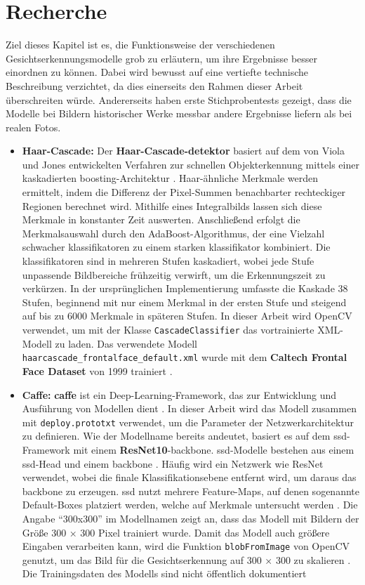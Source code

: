 \chapter{Recherche}
%
Ziel dieses Kapitel ist es, die Funktionsweise der verschiedenen Gesichtserkennungsmodelle grob zu erläutern, um ihre Ergebnisse besser einordnen zu können. Dabei wird bewusst auf eine vertiefte technische Beschreibung verzichtet, da dies einerseits den Rahmen dieser Arbeit überschreiten würde. Andererseits haben erste Stichprobentests gezeigt, dass die Modelle bei Bildern historischer Werke messbar andere Ergebnisse liefern als bei realen Fotos.

\begin{itemize} %
	\item \textbf{Haar-Cascade:} Der \textbf{Haar-Cascade-\gls{detektor}} basiert auf dem von Viola und Jones entwickelten Verfahren zur schnellen Objekterkennung mittels einer kaskadierten \gls{boosting}-Architektur \parencite{ViolaJones2001}. Haar-ähnliche Merkmale werden ermittelt, indem die Differenz der Pixel-Summen benachbarter rechteckiger Regionen berechnet wird. Mithilfe eines Integralbilds lassen sich diese Merkmale in konstanter Zeit auswerten. Anschließend erfolgt die Merkmalsauswahl durch den AdaBoost-Algorithmus, der eine Vielzahl schwacher \gls{klassifikator}en zu einem starken \gls{klassifikator} kombiniert. Die \gls{klassifikator}en sind in mehreren Stufen kaskadiert, wobei jede Stufe unpassende Bildbereiche frühzeitig verwirft, um die Erkennungszeit zu verkürzen. In der ursprünglichen Implementierung umfasste die Kaskade 38 Stufen, beginnend mit nur einem Merkmal in der ersten Stufe und steigend auf bis zu 6000 Merkmale in späteren Stufen. 
In dieser Arbeit wird OpenCV verwendet, um mit der Klasse \texttt{CascadeClassifier} das vortrainierte XML-Modell zu laden. Das verwendete Modell \texttt{haarcascade\_frontalface\_default.xml} wurde mit dem \textbf{Caltech Frontal Face Dataset} von 1999 trainiert \parencite[101–102]{howse2019opencv}.
%
	\item \textbf{Caffe:} \textbf{\gls{caffe}} ist ein Deep-Learning-Framework, das zur Entwicklung und Ausführung von Modellen dient \parencite{JiaSDKLGGD14}. In dieser Arbeit wird das Modell  zusammen mit \texttt{deploy.prototxt} verwendet, um die Parameter der Netzwerkarchitektur zu definieren. Wie der Modellname bereits andeutet, basiert es auf dem \gls{ssd}-Framework mit einem \textbf{ResNet10}-\gls{backbone}. \gls{ssd}-Modelle bestehen aus einem \gls{ssd}-Head und einem \gls{backbone} \parencite{Esri2025SSD}. Häufig wird ein Netzwerk wie ResNet verwendet, wobei die finale Klassifikationsebene entfernt wird, um daraus das \gls{backbone} zu erzeugen. \gls{ssd} nutzt mehrere Feature-Maps, auf denen sogenannte Default-Boxes platziert werden, welche auf Merkmale untersucht werden \parencite{Liu2016}. Die Angabe \enquote{300x300} im Modellnamen zeigt an, dass das Modell mit Bildern der Größe 300 × 300 Pixel trainiert wurde. Damit das Modell auch größere Eingaben verarbeiten kann, wird die Funktion \texttt{blobFromImage} von OpenCV genutzt, um das Bild für die Gesichtserkennung auf 300 × 300 zu skalieren \parencite{sefiks14451}. Die Trainingsdaten des Modells sind nicht öffentlich dokumentiert

\end{itemize}
